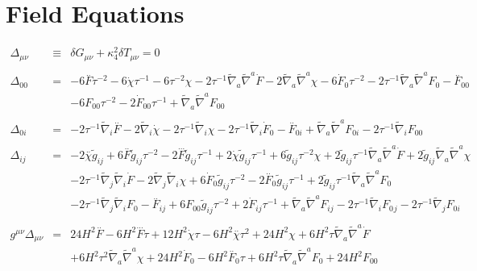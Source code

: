 \documentclass[10pt,letterpaper]{article}
\numberwithin{equation}{section}
\begin{document}
\section{Field Equations}
\begin{eqnarray}
\Delta_{\mu\nu}&\equiv&\delta G_{\mu\nu} + \kappa^2_4 \delta T_{\mu\nu} = 0
\\ \nonumber\\
\Delta_{00}&=& -6 \overset{..}{F} \tau^{-2} - 6 \dot{\chi} \tau^{-1} - 6 \tau^{-2} \chi - 2 \tau^{-1} \tilde{\nabla}_{a}\tilde{\nabla}^{a}\dot{F} - 2 \tilde{\nabla}_{a}\tilde{\nabla}^{a}\chi -6 \dot{F}_{0}{} \tau^{-2} - 2 \tau^{-1} \tilde{\nabla}_{a}\tilde{\nabla}^{a}F_{0}{}- \overset{..}{F}_{00}{} \nonumber \\ 
&& - 6 F_{00}{} \tau^{-2} - 2 \dot{F}_{00}{} \tau^{-1} + \tilde{\nabla}_{a}\tilde{\nabla}^{a}F_{00}{}
\\  \nonumber\\ 
\Delta_{0i}&=& -2 \tau^{-1} \tilde{\nabla}_{i}\overset{..}{F} - 2 \tilde{\nabla}_{i}\dot{\chi} - 2 \tau^{-1} \tilde{\nabla}_{i}\chi -2 \tau^{-1} \tilde{\nabla}_{i}\dot{F}_{0}{}- \overset{..}{F}_{0i}{} + \tilde{\nabla}_{a}\tilde{\nabla}^{a}F_{0i}{} - 2 \tau^{-1} \tilde{\nabla}_{i}F_{00}{}
\\  \nonumber\\ 
\Delta_{ij}&=& -2 \overset{..}{\chi} \tilde{g}_{ij} + 6 \overset{..}{F} \tilde{g}_{ij} \tau^{-2} - 2 \overset{...}{F} \tilde{g}_{ij} \tau^{-1} + 2 \dot{\chi} \tilde{g}_{ij} \tau^{-1} + 6 \tilde{g}_{ij} \tau^{-2} \chi + 2 \tilde{g}_{ij} \tau^{-1} \tilde{\nabla}_{a}\tilde{\nabla}^{a}\dot{F} + 2 \tilde{g}_{ij} \tilde{\nabla}_{a}\tilde{\nabla}^{a}\chi \nonumber \\ 
&& - 2 \tau^{-1} \tilde{\nabla}_{j}\tilde{\nabla}_{i}\dot{F} - 2 \tilde{\nabla}_{j}\tilde{\nabla}_{i}\chi +6 \dot{F}_{0}{} \tilde{g}_{ij} \tau^{-2} - 2 \overset{..}{F}_{0}{} \tilde{g}_{ij} \tau^{-1} + 2 \tilde{g}_{ij} \tau^{-1} \tilde{\nabla}_{a}\tilde{\nabla}^{a}F_{0}{} \nonumber \\ 
&& - 2 \tau^{-1} \tilde{\nabla}_{j}\tilde{\nabla}_{i}F_{0}{}- \overset{..}{F}_{ij} + 6 F_{00}{} \tilde{g}_{ij} \tau^{-2} + 2 \dot{F}_{ij} \tau^{-1} + \tilde{\nabla}_{a}\tilde{\nabla}^{a}F_{ij} - 2 \tau^{-1} \tilde{\nabla}_{i}F_{0}{}_{j} - 2 \tau^{-1} \tilde{\nabla}_{j}F_{0i}{}
\\  \nonumber\\ 
g^{\mu\nu}\Delta_{\mu\nu}&=& 24 H^2 \overset{..}{F} - 6 H^2 \overset{...}{F} \tau + 12 H^2 \dot{\chi} \tau - 6 H^2 \overset{..}{\chi} \tau^2 + 24 H^2 \chi + 6 H^2 \tau \tilde{\nabla}_{a}\tilde{\nabla}^{a}\dot{F} \nonumber \\ 
&& + 6 H^2 \tau^2 \tilde{\nabla}_{a}\tilde{\nabla}^{a}\chi +24 H^2 \dot{F}_{0}{} - 6 H^2 \overset{..}{F}_{0}{} \tau + 6 H^2 \tau \tilde{\nabla}_{a}\tilde{\nabla}^{a}F_{0}{}+24 H^2 F_{00}{}
\end{eqnarray}
%
%
\\ \\
\end{document}
